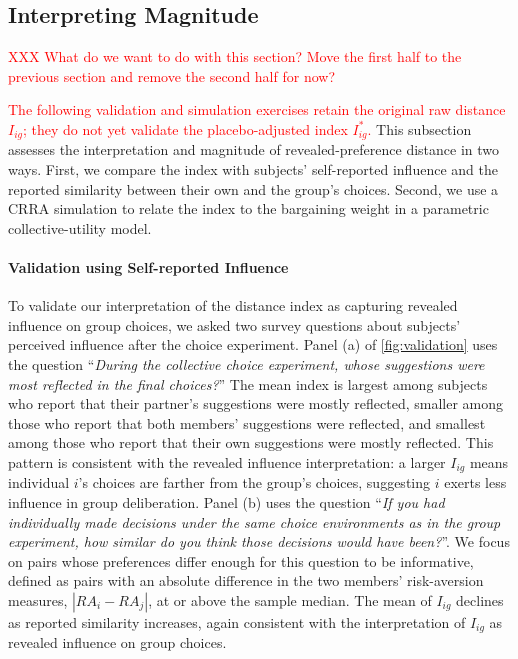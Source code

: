 \documentclass[11 pt]{article}
\begin{document}
\subsection{Interpreting Magnitude}\label{subsec:magnitude}
\textcolor{red}{XXX What do we want to do with this section? Move the first half to the previous section and remove the second half for now?}

\textcolor{red}{The following validation and simulation exercises retain the original raw distance $I_{ig}$; they do not yet validate the placebo-adjusted index $I^*_{ig}$.} This subsection assesses the interpretation and magnitude of revealed-preference distance in two ways. First, we compare the index with subjects' self-reported influence and the reported similarity between their own and the group's choices. Second, we use a CRRA simulation to relate the index to the bargaining weight in a parametric collective-utility model.


\paragraph{Validation using Self-reported Influence}\label{subsection:validation} To validate our interpretation of the distance index as capturing revealed influence on group choices, we asked two survey questions about subjects' perceived influence after the choice experiment. Panel (a) of \autoref{fig:validation} uses the question ``\textit{During the collective choice experiment, whose suggestions were most reflected in the final choices?}'' The mean index is largest among subjects who report that their partner's suggestions were mostly reflected, smaller among those who report that both members' suggestions were reflected, and smallest among those who report that their own suggestions were mostly reflected. This pattern is consistent with the revealed influence interpretation: a larger $I_{ig}$ means individual $i$'s choices are farther from the group's choices, suggesting $i$ exerts less influence in group deliberation. Panel (b) uses the question ``\textit{If you had individually made decisions under the same choice environments as in the group experiment, how similar do you think those decisions would have been?}''. We focus on pairs whose preferences differ enough for this question to be informative, defined as pairs with an absolute difference in the two members' risk-aversion measures, $|RA_i-RA_j|$, at or above the sample median. The mean of $I_{ig}$ declines as reported similarity increases, again consistent with the interpretation of $I_{ig}$ as revealed influence on group choices.
\end{document}
